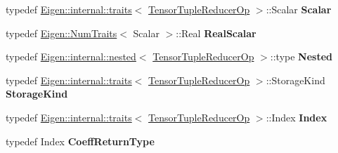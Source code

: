 \begin{DoxyCompactItemize}
\mbox{\label{class_eigen_1_1_tensor_tuple_reducer_op_aa9177073b5b64bfc7b6b9ff1ff773f19}} 
typedef \hyperlink{struct_eigen_1_1internal_1_1traits}{Eigen\+::internal\+::traits}$<$ \hyperlink{class_eigen_1_1_tensor_tuple_reducer_op}{Tensor\+Tuple\+Reducer\+Op} $>$\+::Scalar {\bfseries Scalar}
\item 
\mbox{\label{class_eigen_1_1_tensor_tuple_reducer_op_afd4032323bbc353effde4d597f805743}} 
typedef \hyperlink{group___core___module_struct_eigen_1_1_num_traits}{Eigen\+::\+Num\+Traits}$<$ Scalar $>$\+::Real {\bfseries Real\+Scalar}
\item 
\mbox{\label{class_eigen_1_1_tensor_tuple_reducer_op_a0ce79b4f18fe2554cb5548d0b30f4008}} 
typedef \hyperlink{struct_eigen_1_1internal_1_1nested}{Eigen\+::internal\+::nested}$<$ \hyperlink{class_eigen_1_1_tensor_tuple_reducer_op}{Tensor\+Tuple\+Reducer\+Op} $>$\+::type {\bfseries Nested}
\item 
\mbox{\label{class_eigen_1_1_tensor_tuple_reducer_op_a8f88940b5898191b7622dfaaab035cde}} 
typedef \hyperlink{struct_eigen_1_1internal_1_1traits}{Eigen\+::internal\+::traits}$<$ \hyperlink{class_eigen_1_1_tensor_tuple_reducer_op}{Tensor\+Tuple\+Reducer\+Op} $>$\+::Storage\+Kind {\bfseries Storage\+Kind}
\item 
\mbox{\label{class_eigen_1_1_tensor_tuple_reducer_op_ae3cee19dcb6704c32981737d0eec926e}} 
typedef \hyperlink{struct_eigen_1_1internal_1_1traits}{Eigen\+::internal\+::traits}$<$ \hyperlink{class_eigen_1_1_tensor_tuple_reducer_op}{Tensor\+Tuple\+Reducer\+Op} $>$\+::Index {\bfseries Index}
\item 
\mbox{\label{class_eigen_1_1_tensor_tuple_reducer_op_a65b018a64cbe9957152e1d6536faef49}} 
typedef Index {\bfseries Coeff\+Return\+Type}
\end{DoxyCompactItemize}
